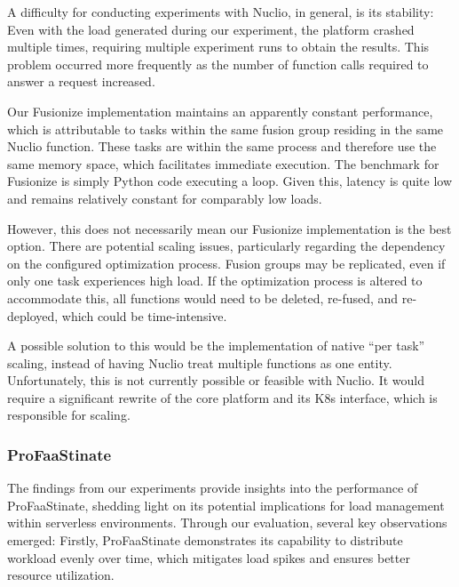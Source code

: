 A difficulty for conducting experiments with Nuclio, in general, is its
stability: Even with the load generated during our experiment, the platform
crashed multiple times, requiring multiple experiment runs to obtain the
results. This problem occurred more frequently as the number of function calls
required to answer a request increased.

Our Fusionize implementation maintains an apparently constant performance, which
is attributable to tasks within the same fusion group residing in the same
Nuclio function. These tasks are within the same process and therefore use the
same memory space, which facilitates immediate execution. The benchmark for
Fusionize is simply Python code executing a loop. Given this, latency is quite
low and remains relatively constant for comparably low loads.

However, this does not necessarily mean our Fusionize implementation is the best
option. There are potential scaling issues, particularly regarding the
dependency on the configured optimization process. Fusion groups may be
replicated, even if only one task experiences high load. If the optimization
process is altered to accommodate this, all functions would need to be deleted,
re-fused, and re-deployed, which could be time-intensive.

A possible solution to this would be the implementation of native \enquote{per
task} scaling, instead of having Nuclio treat multiple functions as one entity.
Unfortunately, this is not currently possible or feasible with Nuclio. It would
require a significant rewrite of the core platform and its K8s interface, which
is responsible for scaling.

\subsubsection{ProFaaStinate}


The findings from our experiments provide insights into the performance of
ProFaaStinate, shedding light on its potential implications for load management
within serverless environments. Through our evaluation, several key observations
emerged: Firstly, ProFaaStinate demonstrates its capability to distribute
workload evenly over time, which mitigates load spikes and ensures better
resource utilization.



